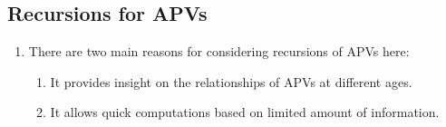 \subsection{Recursions for APVs}
\begin{enumerate}
\item There are two main reasons for considering recursions of APVs here:
\begin{enumerate}
\item It provides insight on the relationships of APVs at different ages.
\item It allows quick computations based on limited amount of information.
\end{enumerate}
\end{enumerate}
